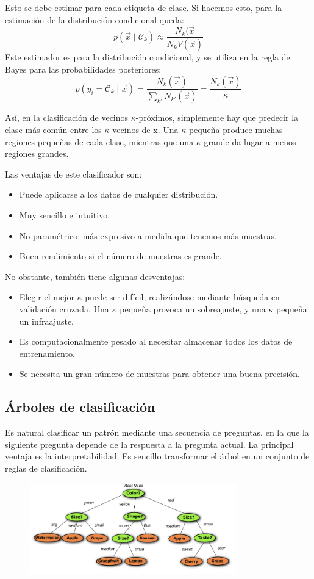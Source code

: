 Esto se debe estimar para cada etiqueta de clase. Si hacemos esto, para la estimación de la distribución condicional queda:
$$p(\vec{x} \mid \mathcal{C}_k) \approx \frac{N_k(\vec{x}}{N_k V(\vec{x})}$$
Este estimador es para la distribución condicional, y se utiliza en la regla de Bayes para las probabilidades posteriores:
$$p(y_i = \mathcal{C}_k \mid \vec{x}) = \frac{N_k (\vec{x})}{\sum_{k'} N_{k'}(\vec{x})} = \frac{N_k(\vec{x})}{\kappa}$$

Así, en la clasificación de vecinos $\kappa$-próximos, simplemente hay que predecir la clase más común entre los $\kappa$ vecinos de x. Una $\kappa$ pequeña produce muchas regiones pequeñas de cada clase, mientras que una $\kappa$ grande da lugar a menos regiones grandes.

Las ventajas de este clasificador son:
\begin{itemize}
\item Puede aplicarse a los datos de cualquier distribución.
\item Muy sencillo e intuitivo.
\item No paramétrico: más expresivo a medida que tenemos más muestras.
\item Buen rendimiento si el número de muestras es grande.
\end{itemize}

No obstante, también tiene algunas desventajas:
\begin{itemize}
\item Elegir el mejor $\kappa$ puede ser difícil, realizándose mediante búsqueda en validación cruzada. Una $\kappa$ pequeña provoca un sobreajuste, y una $\kappa$ pequeña un infraajuste.
\item Es computacionalmente pesado al necesitar almacenar todos los datos de entrenamiento.
\item Se necesita un gran número de muestras para obtener una buena precisión.
\end{itemize}

\subsection{Árboles de clasificación}
Es natural clasificar un patrón mediante una secuencia de preguntas, en la que la siguiente pregunta depende de la respuesta a la pregunta actual. La principal ventaja es la interpretabilidad. Es sencillo transformar el árbol en un conjunto de reglas de clasificación.

\begin{figure}[h]
\centering
\includegraphics[width = 0.8\textwidth]{figs/classification-tree.png}
\end{figure}

